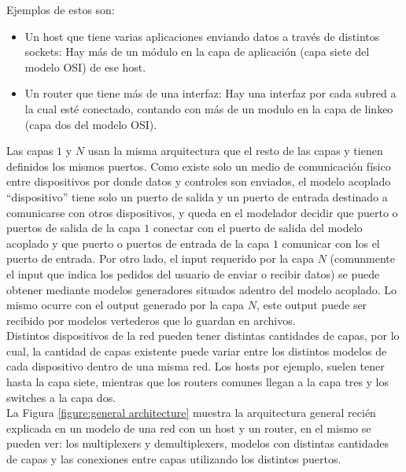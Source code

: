 \documentclass[10pt,a4paper]{article}
\begin{document}
Ejemplos de estos son: 
\begin{itemize}
\item Un host que tiene varias aplicaciones enviando datos a través de distintos sockets: Hay más de un módulo en la capa de aplicación (capa siete del modelo OSI) de ese host.
\item  Un router que tiene más de una interfaz: Hay una interfaz por cada subred a la cual esté conectado, contando con más de un modulo en la capa de linkeo (capa dos del modelo OSI).
\end{itemize}

Las capas $1$ y $N$ usan la misma arquitectura que el resto de las capas y tienen definidos los mismos puertos. Como existe solo un medio de comunicación físico entre dispositivos por donde datos y controles son enviados, el modelo acoplado ``dispositivo'' tiene solo un puerto de salida y un puerto de entrada destinado a comunicarse con otros dispositivos, y queda en el modelador decidir que puerto o puertos de salida de la capa $1$ conectar con el puerto de salida del modelo acoplado y que puerto o puertos de entrada de la capa $1$ comunicar con los el puerto de entrada. Por otro lado, el input requerido por la capa $N$ (comunmente el input que indica los pedidos del usuario de enviar o recibir datos) se puede obtener mediante modelos generadores situados adentro del modelo acoplado. Lo mismo ocurre con el output generado por la capa $N$, este output puede ser recibido por modelos vertederos que lo guardan en archivos. \\

Distintos dispositivos de la red pueden tener distintas cantidades de capas, por lo cual, la cantidad de capas existente puede variar entre los distintos modelos de cada dispositivo dentro de una misma red. Los hosts por ejemplo, suelen tener hasta la capa siete, mientras que los routers comunes llegan a la capa tres y los switches a la capa dos. \\

La Figura \ref{figure:general architecture} muestra la arquitectura general recién explicada en un modelo de una red con un host y un router, en el mismo se pueden ver: los multiplexers y demultiplexers, modelos con distintas cantidades de capas y las conexiones entre capas utilizando los distintos puertos. \\
\end{document}
